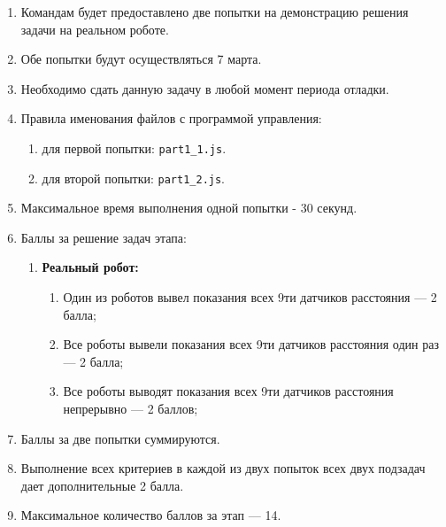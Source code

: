
\begin{enumerate}
    \item Командам будет предоставлено две попытки на демонстрацию решения задачи на реальном
    роботе.
    \item Обе попытки будут осуществляться 7 марта.
    \item Необходимо сдать данную задачу в любой момент периода отладки.
    \item Правила именования файлов с программой управления:
    \begin{enumerate}
        \item для первой попытки: \texttt{part1\_1.js}.
        \item для второй попытки: \texttt{part1\_2.js}.
    \end{enumerate}
    \item Максимальное время выполнения одной попытки - 30 секунд.
    \item Баллы за решение задач этапа:
        \begin{enumerate}
            \item \textbf{Реальный робот:}
            \begin{enumerate}
                \item Один из роботов вывел показания всех 9ти датчиков расстояния --- 2 балла;
                \item Все роботы вывели показания всех 9ти датчиков расстояния один раз --- 2 балла;
                \item Все роботы выводят показания всех 9ти датчиков расстояния непрерывно --- 2 баллов;
            \end{enumerate}
        \end{enumerate}
    \item Баллы за две попытки суммируются.
    \item Выполнение всех критериев в каждой из двух попыток всех двух подзадач дает дополнительные 2 балла.
    \item Максимальное количество баллов за этап --- 14.
\end{enumerate}